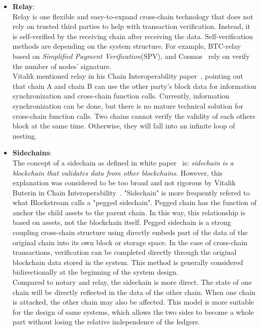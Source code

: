 \begin{itemize}
    \item \textbf{Relay\cite{buterin2016chain}}:\\
    Relay is one flexible and easy-to-expand cross-chain technology that does not rely on trusted third parties to help with transaction verification. Instead, it is self-verified by the receiving chain after receiving the data. Self-verification methods are depending on the system structure. For example, BTC-relay\cite{btc-relay} based on \textit{Simplified Payment Verification}(SPV), and Cosmos~\cite{cosmos} rely on verify the number of nodes' signature.\\
    
    Vitalik mentioned relay in his Chain Interoperability paper~\cite{buterin2016chain}, pointing out that chain A and chain B can use the other party's block data for information synchronization and cross-chain function calls. Currently, information synchronization can be done, but there is no mature technical solution for cross-chain function calls. Two chains cannot verify the validity of each others block at the same time. Otherwise, they will fall into an infinite loop of nesting. 
    
    
    
    \item \textbf{Sidechains}:\\
     The concept of a sidechain as defined in white paper~\cite{back2014enabling} is: \textit{sidechain is a blockchain that validates data from other blockchains}. However, this explanation was considered to be too broad and not rigorous by Vitalik Buterin in Chain Interoperability~\cite{buterin2016chain}. "Sidechain" is more frequently  refered to what Blockstream calls a "pegged sidechain". Pegged chain has the function of anchor the child assets to the parent chain. In this way, this relationship is based on assets, not the blockchain itself. Pegged sidechain is a strong coupling cross-chain structure using directly embeds part of the data of the original chain into its own block or storage space. In the case of cross-chain transactions,  verification can be completed directly through the original blockchain data stored in the system. This method is generally considered bidirectionally at the beginning of the system design.\\
     
     Compared to notary and relay, the sidechain is more direct. The state of one chain will be directly reflected in the data of the other chain. When one chain is attacked, the other chain may also be affected. This model is more suitable for the design of same systems, which allows the two sides to become a whole part without losing the relative independence of the ledgers.

\end{itemize}
